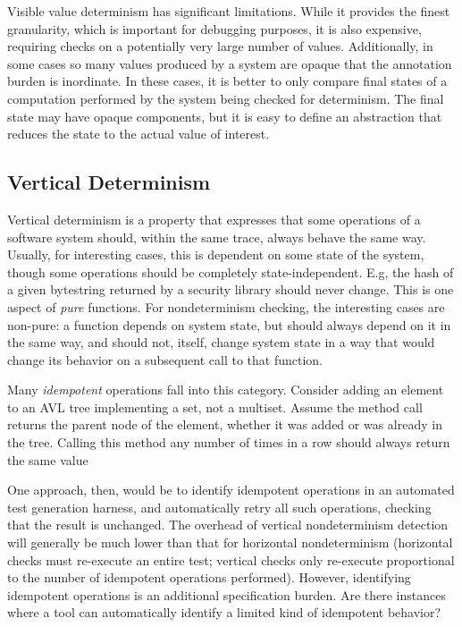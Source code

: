 Visible value determinism has significant limitations.  While it
provides the finest granularity, which is
important for debugging purposes, it is also expensive, requiring
checks on a potentially very large number of
values.  Additionally, in some cases so many values produced by a
system are opaque that the annotation burden is inordinate.  In these
cases, it is better to only compare final states of a computation
performed by the system being checked for determinism.  The final
state may have opaque components, but it is easy to define an
abstraction that reduces the state to the actual value of interest.



\subsection{Vertical Determinism}

Vertical determinism is a property that expresses that some operations
of a software system should, within the same trace, always behave the
same way.  Usually, for interesting cases, this is dependent on some
state of the system, though some operations should be completely
state-independent.  E.g, the hash of a given bytestring returned by a
security library should never change.  This is one aspect of
\emph{pure} functions.  For nondeterminism checking, the interesting
cases are non-pure: a function depends on system state, but should
always depend on it in the same way, and should not, itself, change
system state in a way that would change its behavior on a subsequent
call to that function.

Many \emph{idempotent} operations fall into this category.
Consider adding an element to an AVL tree implementing a set, not a
multiset.  Assume the method call returns the parent node of the
element, whether it was added or was already in the tree.  Calling
this method any number of times in a row should always return the
same value

One approach, then, would be to identify
idempotent operations in an automated test generation harness, and
automatically retry all such operations, checking that the
result is unchanged.  The overhead of vertical nondeterminism detection will
generally be much lower than that for horizontal nondeterminism
(horizontal checks must re-execute an entire test; vertical checks
only re-execute proportional to the number of idempotent operations
performed).  However, identifying idempotent operations is an additional specification burden.  Are there instances where a tool
can automatically identify a limited kind of idempotent behavior?

